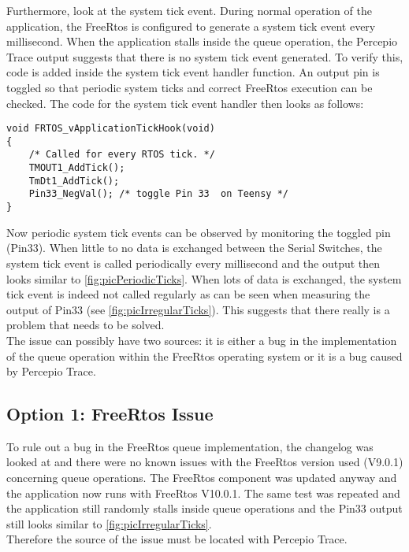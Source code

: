 Furthermore, look at the system tick event. During normal operation of the application, the FreeRtos is configured to generate a system tick event every millisecond. When the application stalls inside the queue operation, the Percepio Trace output suggests that there is no system tick event generated. To verify this, code is added inside the system tick event handler function. An output pin is toggled so that periodic system ticks and correct FreeRtos execution can be checked. The code for the system tick event handler then looks as follows:
\begin{lstlisting}
void FRTOS_vApplicationTickHook(void)
{
    /* Called for every RTOS tick. */
    TMOUT1_AddTick();
    TmDt1_AddTick();
    Pin33_NegVal(); /* toggle Pin 33  on Teensy */
}
\end{lstlisting}
Now periodic system tick events can be observed by monitoring the toggled pin (Pin33). When little to no data is exchanged between the Serial Switches, the system tick event is called periodically every millisecond and the output then looks similar to \autoref{fig:picPeriodicTicks}. When lots of data is exchanged, the system tick event is indeed not called regularly as can be seen when measuring the output of Pin33 (see \autoref{fig:picIrregularTicks}). This suggests that there really is a problem that needs to be solved.\\
%
%
The issue can possibly have two sources: it is either a bug in the implementation of the queue operation within the FreeRtos operating system or it is a bug caused by Percepio Trace.
%
\subsection{Option 1: FreeRtos Issue}
To rule out a bug in the FreeRtos queue implementation, the changelog was looked at and there were no known issues with the FreeRtos version used (V9.0.1) concerning queue operations. The FreeRtos component was updated anyway and the application now runs with FreeRtos V10.0.1. The same test was repeated and the application still randomly stalls inside queue operations and the Pin33 output still looks similar to \autoref{fig:picIrregularTicks}.\\
Therefore the source of the issue must be located with Percepio Trace.
%
